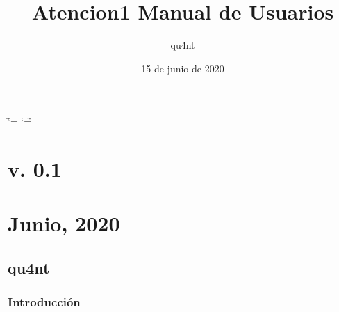\documentclass[letterpaper,10pt,spanish]{sphinxmanual}
\title{Atencion\sphinxhyphen{}1 Manual de Usuarios}
\date{15 de junio de 2020}
\author{qu4nt}
\begin{document}
\ifdefined\shorthandoff
  \ifnum\catcode`\=\string=\active\shorthandoff{=}\fi
  \ifnum\catcode`\"=\active{}\fi
\fi

\pagestyle{empty}
\sphinxmaketitle
\pagestyle{plain}
\sphinxtableofcontents
\pagestyle{normal}
\label{\detokenize{index::doc}}
\noindent{}




\chapter{v. 0.1}
\label{\detokenize{index:v-0-1}}

\chapter{Junio, 2020}
\label{\detokenize{index:junio-2020}}

\section{qu4nt}
\label{\detokenize{index:qu4nt}}

\subsection{Introducción}
\label{\detokenize{introduccion:introduccion}}\label{\detokenize{introduccion::doc}}
\end{document}

